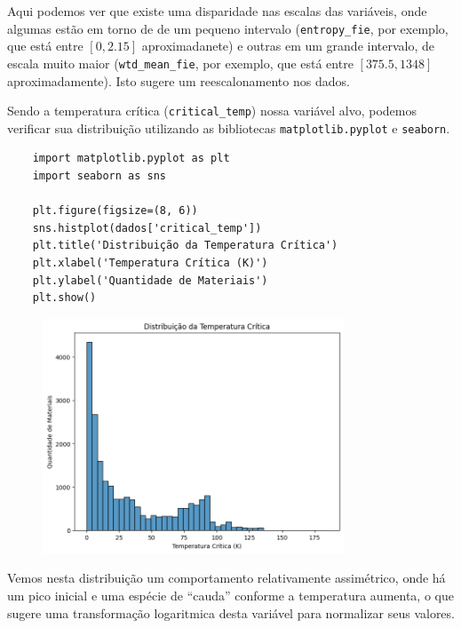 Aqui podemos ver que existe uma disparidade nas escalas das variáveis, onde algumas estão em torno de de um pequeno intervalo (\verb|entropy_fie|, por exemplo, que está entre $[0,2.15]$ aproximadanete) e outras em um grande intervalo, de escala muito maior (\verb|wtd_mean_fie|, por exemplo, que está entre $[375.5, 1348]$ aproximadamente). Isto sugere um reescalonamento nos dados.

Sendo a temperatura crítica (\verb|critical_temp|) nossa variável alvo, podemos verificar sua distribuição utilizando as bibliotecas \verb|matplotlib.pyplot| e \verb|seaborn|.
\begin{longlisting}
    \begin{verbatim}
    import matplotlib.pyplot as plt
    import seaborn as sns

    plt.figure(figsize=(8, 6))
    sns.histplot(dados['critical_temp'])
    plt.title('Distribuição da Temperatura Crítica')
    plt.xlabel('Temperatura Crítica (K)')
    plt.ylabel('Quantidade de Materiais')
    plt.show()
    \end{verbatim}
\end{longlisting}
\begin{figure}[H]
    \centering
    \includegraphics[width=0.8\textwidth]{figures/temperature_distribution.png}
\end{figure}

Vemos nesta distribuição um comportamento relativamente assimétrico, onde há um pico inicial e uma espécie de ``cauda'' conforme a temperatura aumenta, o que sugere uma transformação logaritmica desta variável para normalizar seus valores.

